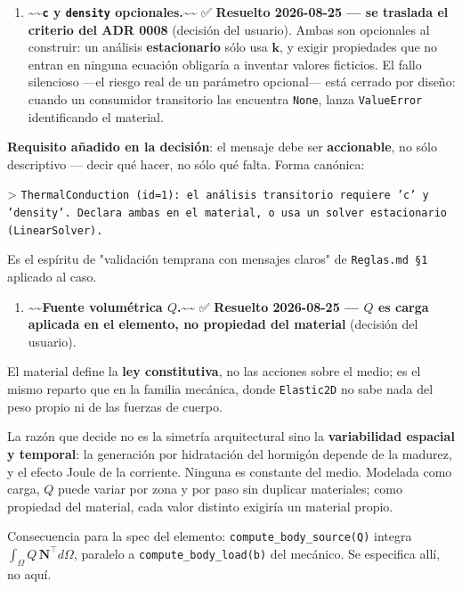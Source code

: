\documentclass[11pt,letterpaper,oneside]{report}
\begin{document}
\begin{enumerate}
  \item \textasciitilde{}\textasciitilde{}\textbf{\texttt{c} y \texttt{density} opcionales.}\textasciitilde{}\textasciitilde{} ✅ \textbf{Resuelto 2026-08-25 --- se traslada el criterio del ADR 0008} (decisión del usuario). Ambas son opcionales al construir: un análisis \textbf{estacionario} sólo usa $\mathbf k$, y exigir propiedades que no entran en ninguna ecuación obligaría a inventar valores ficticios. El fallo silencioso ---el riesgo real de un parámetro opcional--- está cerrado por diseño: cuando un consumidor transitorio las encuentra \texttt{None}, lanza \texttt{ValueError} identificando el material.
\end{enumerate}

   \textbf{Requisito añadido en la decisión}: el mensaje debe ser \textbf{accionable}, no sólo descriptivo --- decir qué hacer, no sólo qué falta. Forma canónica:

   > \texttt{ThermalConduction (id=1): el análisis transitorio requiere 'c' y 'density'. Declara ambas en el material, o usa un solver estacionario (LinearSolver).}

   Es el espíritu de "validación temprana con mensajes claros" de \texttt{Reglas.md §1} aplicado al caso.

\begin{enumerate}
  \item \textasciitilde{}\textasciitilde{}\textbf{Fuente volumétrica $Q$.}\textasciitilde{}\textasciitilde{} ✅ \textbf{Resuelto 2026-08-25 --- $Q$ es carga aplicada en el elemento, no propiedad del material} (decisión del usuario).
\end{enumerate}

   El material define la \textbf{ley constitutiva}, no las acciones sobre el medio; es el mismo reparto que en la familia mecánica, donde \texttt{Elastic2D} no sabe nada del peso propio ni de las fuerzas de cuerpo.

   La razón que decide no es la simetría arquitectural sino la \textbf{variabilidad espacial y temporal}: la generación por hidratación del hormigón depende de la madurez, y el efecto Joule de la corriente. Ninguna es constante del medio. Modelada como carga, $Q$ puede variar por zona y por paso sin duplicar materiales; como propiedad del material, cada valor distinto exigiría un material propio.

   Consecuencia para la spec del elemento: \texttt{compute\_body\_source(Q)} integra $\int_\Omega Q\,\mathbf N^\top d\Omega$, paralelo a \texttt{compute\_body\_load(b)} del mecánico. Se especifica allí, no aquí.
\end{document}
